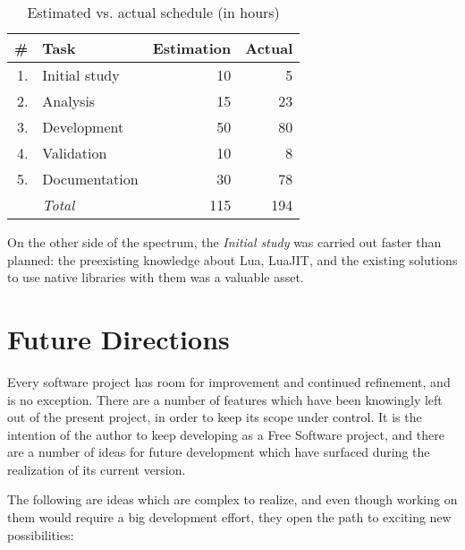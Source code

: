 \begin{table}[t]
	\centering
	\begin{tabular}{rlrr}
		\toprule
		\# & Task & Estimation & Actual \\
		\midrule
		1. & Initial study     & 10 &  5 \\
		2. & Analysis          & 15 & 23 \\
		3. & Development       & 50 & 80 \\
		4. & Validation        & 10 &  8 \\
		5. & Documentation     & 30 & 78 \\
		\midrule
		  & \emph{Total}      & 115 & 194\\
		\bottomrule
	\end{tabular}
	\caption{Estimated vs. actual schedule (in hours)}
	\label{tab:sched-postmortem}
\end{table}

On the other side of the spectrum, the \emph{Initial study} was carried out
faster than planned: the preexisting knowledge about Lua, LuaJIT, and the
existing solutions to use native libraries with them was a valuable asset.


\section{Future Directions}

Every software project has room for improvement and continued refinement, and
\Eol* is no exception. There are a number of features which have been
knowingly left out of the present project, in order to keep its scope under
control. It is the intention of the author to keep developing \Eol* as a Free
Software project, and there are a number of ideas for future development which
have surfaced during the realization of its current version.

The following are ideas which are complex to realize, and even though working
on them would require a big development effort, they open the path to exciting
new possibilities:

